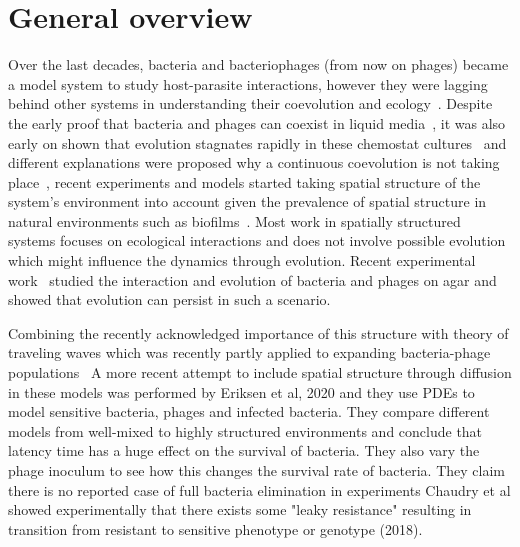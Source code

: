 
\section{General overview}

Over the last decades, bacteria and bacteriophages (from now on phages) became a model system to study host-parasite interactions, however they were lagging behind other systems in understanding their coevolution and ecology~\cite{Koskella2014}.
Despite the early proof that bacteria and phages can coexist in liquid media~\cite{Chao1977}, it was also early on shown that evolution stagnates rapidly in these chemostat cultures~\cite{Lenski1985} and different explanations were proposed why a continuous coevolution is not taking place~\cite{Lenski1984}, recent experiments and models started taking spatial structure of the system's environment into account given the prevalence of spatial structure in natural environments such as biofilms~\cite{Krysiak-Baltyn2016-xi, Gourley2004-rx}. Most work in spatially structured systems focuses on ecological interactions and does not involve possible evolution which might influence the dynamics through evolution. Recent experimental work~\cite{ShaerTamar2022} studied the interaction and evolution of bacteria and phages on agar and showed that evolution can persist in such a scenario.

Combining the recently acknowledged importance of this structure with theory of traveling waves which was recently partly applied to expanding bacteria-phage populations~\cite{Wang2024, Claydon2021}
A more recent attempt to include spatial structure through diffusion in these models was performed by Eriksen et al, 2020 and they use PDEs to model sensitive bacteria, phages and infected bacteria. They compare different models from well-mixed to highly structured environments and conclude that latency time has a huge effect on the survival of bacteria. They also vary the phage inoculum to see how this changes the survival rate of bacteria.
They claim there is no reported case of full bacteria elimination in experiments
Chaudry et al showed experimentally that there exists some "leaky resistance" resulting in transition from resistant to sensitive phenotype or genotype (2018).

